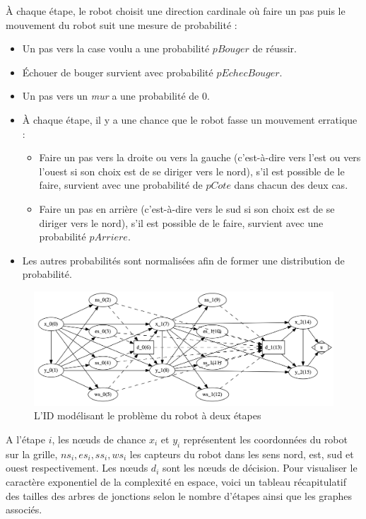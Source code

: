 \documentclass[12pt]{article}
\begin{document}
À chaque étape, le robot choisit une direction cardinale où faire un pas puis le mouvement du robot suit une mesure de probabilité :
\begin{itemize}
  \item Un pas vers la case voulu a une probabilité $pBouger$ de réussir.
  \item Échouer de bouger survient avec probabilité $pEchecBouger$.
  \item Un pas vers un \textit{mur} a une probabilité de 0.
  \item À chaque étape, il y a une chance que le robot fasse un mouvement erratique :
  \begin{itemize}
        \item Faire un pas vers la droite ou vers la gauche (c'est-à-dire vers l'est ou vers l'ouest si son choix est de se diriger vers le nord), s'il est possible de le faire, survient avec une probabilité de $pCote$ dans chacun des deux cas.
        \item Faire un pas en arrière (c'est-à-dire vers le sud si son choix est de se diriger vers le nord), s'il est possible de le faire, survient avec une probabilité $pArriere$.
        \end{itemize}
  \item Les autres probabilités sont normalisées afin de former une distribution de probabilité.
\end{itemize}

\begin{figure}[h]
\centering
\includegraphics[scale=0.22]{docs/ressources_rapport/IDROBOT.png}
\caption{L'ID modélisant le problème du robot à deux étapes }
\end{figure}

A l'étape $i$, les nœuds de chance $x_i$ et $y_i$ représentent les coordonnées du robot sur la grille, $ns_i, es_i, ss_i, ws_i$ les capteurs du robot dans les sens nord, est, sud et ouest respectivement. Les nœuds $d_i$ sont les nœuds de décision.
Pour visualiser le caractère exponentiel de la complexité en espace, voici un tableau récapitulatif des tailles des arbres de jonctions selon le nombre d'étapes ainsi que les graphes associés.
\end{document}
